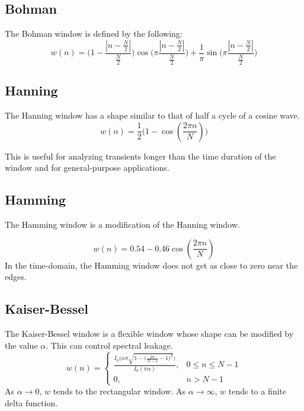 \documentclass{article}
\theoremstyle{mystyle}
\begin{document}
\subsection{Bohman}
\noindent The Bohman window is defined by the following:
\begin{equation}
w(n) = \bigg(1-\frac{|n-\frac{N}{2}|}{\frac{N}{2}}\bigg)\cos\bigg(\pi\frac{|n-\frac{N}{2}|}{\frac{N}{2}}\bigg)+\frac{1}{\pi}\sin\bigg(\pi\frac{|n-\frac{N}{2}|}{\frac{N}{2}}\bigg)
\end{equation}

\subsection{Hanning}
\noindent The Hanning window has a shape similar to that of half a cycle of a cosine wave.
\begin{equation}
w(n) = \frac{1}{2}\bigg(1-\cos(\frac{2\pi n}{N})\bigg)
\end{equation}

\noindent This is useful for analyzing transients longer than the time duration of the window and for general-purpose applications.

\subsection{Hamming}
The Hamming window is a modification of the Hanning window.

\begin{equation}
w(n) = 0.54 - 0.46\cos(\frac{2\pi n}{N})
\end{equation}
\noindent In the time-domain, the Hamming window does not get as close to zero near the edges.
\subsection{Kaiser-Bessel}
The Kaiser-Bessel window is a flexible window whose shape can be modified by the value $\alpha$. This can control spectral leakage.
\begin{equation}
w(n) = \begin{cases} \frac{I_{0}\bigg(\alpha \pi \sqrt{1-\big(\frac{2n}{N-1}-1\big)^2}\bigg)}{I_{0}(\pi\alpha)}, & 0 \leq n \leq N-1\\ 0, & n>N-1\end{cases}
\end{equation}
\noindent As $\alpha \rightarrow 0$, $w$ tends to the rectangular window. As $\alpha \rightarrow \infty$, $w$ tends to a finite delta function. 
\end{document}
